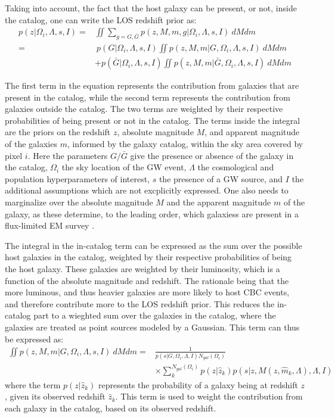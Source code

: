 Taking into account, the fact that the host galaxy can be present, or not, inside the catalog, one can write the \ac{LOS} redshift prior as:
\begin{align}
  p(z|\Omega_i, \Lambda, s, I) =& \iint \sum_{g=G,\bar{G}} p(z, M, m,g|\Omega_i, \Lambda, s, I)~dM dm \\
  =&~p(G|\Omega_i, \Lambda, s, I) \iint p(z, M, m|G,\Omega_i, \Lambda, s, I)~dM dm \nonumber \\
  &+ p(\bar{G}|\Omega_i, \Lambda, s, I) \iint p(z, M, m|\bar{G},\Omega_i, \Lambda, s, I)~dM dm
\end{align}

The first term in the equation represents the contribution from galaxies that are present in the catalog, while the second term represents the contribution from galaxies outside the catalog. The two terms are weighted by their respective probabilities of being present or not in the catalog. The terms inside the integral are the priors on the redshift $z$, absolute magnitude $M$, and apparent magnitude of the galaxies $m$, informed by the galaxy catalog, within the sky area covered by pixel $i$. Here the parameters $G/\bar{G}$ give the presence or absence of the galaxy in the catalog, $\Omega_i$ the sky location of the \ac{GW} event, $\Lambda$ the cosmological and population hyperparameters of interest, $s$ the presence of a \ac{GW} source, and $I$ the additional assumptions which are not excplicitly expressed. One also needs to marginalize over the absolute magnitude $M$ and the apparent magnitude $m$ of the galaxy, as these determine, to the leading order, which galaxiess are present in a flux-limited \ac{EM} survey \citep{gray2023joint}.

The integral in the in-catalog term can be expressed as the sum over the possible host galaxies in the catalog, weighted by their respective probabilities of being the host galaxy. These galaxies are weighted by their luminosity, which is a function of the absolute magnitude and redshift. The rationale being that the more luminous, and thus heavier galaxies are more likely to host \ac{CBC} events, and therefore contribute more to the \ac{LOS} redshift prior. This reduces the in-catalog part to a wieghted sum over the galaxies in the catalog, where the galaxies are treated as point sources modeled by a Gaussian. This term can thus be expressed as:
\begin{align}
  \iint p(z, M, m|G,\Omega_i, \Lambda, s, I)~dM dm =& \frac{1}{p(s|G,\Omega_i, \Lambda, I)N_{gal}(\Omega_i)} \nonumber\\ 
  &\times \sum_{k}^{N_{gal}(\Omega_i)} p(z|\hat{z}_k) p(s|z, M(z, \hat{m}_k, \Lambda), \Lambda, I)
\end{align}
where the term $p(z|\hat{z}_k)$ represents the probability of a galaxy being at redshift $z$, given its observed redshift $\hat{z}_k$. This term is used to weight the contribution from each galaxy in the catalog, based on its observed redshift.

